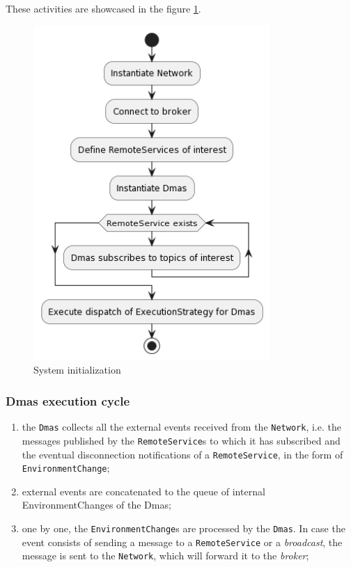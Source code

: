 These activities are showcased in the figure \ref{fig:initialization}.

\begin{figure}[ht!]
    \centering
    \includegraphics[width=0.8\textwidth]{figures/activity-dmas.png}
    \caption{System initialization}
    \label{fig:initialization}
\end{figure}

\subsubsection{Dmas execution cycle}

\begin{enumerate}
    \item the \texttt{Dmas} collects all the external events received from the \texttt{Network},
          i.e. the messages published by the \texttt{RemoteService}s to which it has subscribed and the eventual disconnection notifications of a \texttt{RemoteService},
          in the form of \texttt{EnvironmentChange};
    \item external events are concatenated to the queue of internal EnvironmentChanges of the Dmas;
    \item one by one, the \texttt{EnvironmentChange}s are processed by the \texttt{Dmas}. In case the event consists of sending a message to a \texttt{RemoteService} or a \textit{broadcast}, the message is sent to the \texttt{Network}, which will forward it to the \textit{broker};
\end{enumerate}

